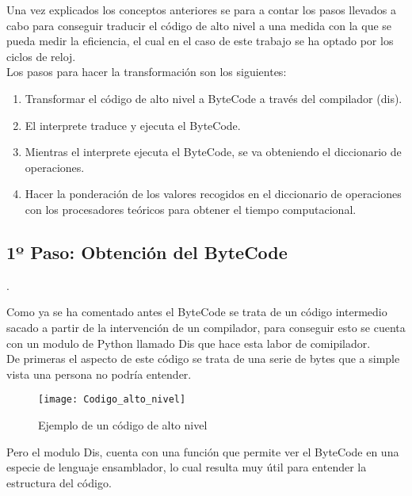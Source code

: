 Una vez explicados los conceptos anteriores se para a contar los pasos llevados a cabo para conseguir traducir el código de alto nivel a una medida con la que se pueda medir la eficiencia,  el cual en el caso de este trabajo se ha optado por los ciclos de reloj.\\
Los pasos para hacer la transformación son los siguientes:\\
\begin{enumerate}
	\item Transformar el código de alto nivel a ByteCode a través del compilador (dis).
	\item El interprete traduce y ejecuta el ByteCode.
	\item Mientras el interprete ejecuta el ByteCode, se va obteniendo el diccionario de operaciones.
	\item Hacer la ponderación de los valores recogidos en el diccionario de operaciones con los procesadores teóricos para obtener el tiempo computacional.
\end{enumerate}


\subsection{1º Paso: Obtención del ByteCode}.

Como ya se ha  comentado antes el ByteCode se trata  de un código intermedio sacado  a partir de la intervención de un compilador, para conseguir esto se cuenta con un modulo de Python llamado Dis que hace esta labor de comipilador.\\
De primeras el aspecto de este código se trata de una serie de bytes que a simple vista una persona no podría entender.\\


\begin{figure}[htb]
\centering
\texttt{[image: Codigo\_alto\_nivel]}
\caption{Ejemplo de un código de alto nivel} \label{fig:horizonte}
\end{figure}

Pero el modulo Dis, cuenta con una función que permite ver el ByteCode en una especie de lenguaje ensamblador, lo cual resulta muy útil para entender la estructura del código.\\


